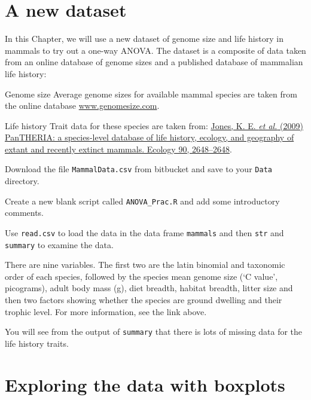 \section{A new dataset}

In this Chapter, we will use a new dataset of genome size and life 
history in mammals to try out a one-way ANOVA. The dataset is a 
composite of data taken from an online database of genome sizes and a 
published database of mammalian life history:

\begin{compactdesc}
	\item[Genome size] Average genome sizes for available mammal species 
	are taken from the online database  
	\href{www.genomesize.com}{www.genomesize.com}.
	\item[Life history] Trait data for these species are taken from: 
	\href{http://esapubs.org/archive/ecol/e090/184/metadata.htm}{
	Jones, K. E. {\it et al.} (2009) PanTHERIA: a species-level database 
	of life history, ecology, and geography of extant and recently 
	extinct mammals. Ecology 90, 2648--2648}.
\end{compactdesc}

\begin{compactitem}[$\quad\star$]
	\item Download the file {\tt MammalData.csv} from bitbucket and save 
	to your {\tt Data} directory.
	\item Create a new blank script called {\tt ANOVA\_Prac.R} and add 
	some introductory comments.
	\item Use {\tt read.csv} to load the data in the data frame 
	{\tt mammals} and then {\tt str} and {\tt summary} to examine 
	the data.
\end{compactitem}

There are nine variables. The first two are the latin binomial and 
taxonomic order of each species, followed by the species mean genome 
size (`C value', picograms), adult body mass (g), diet breadth, habitat 
breadth, litter size and then two factors showing whether the species 
are ground dwelling and their trophic level. For more information, see 
the link above.

You will see from the output of {\tt summary} that there is lots of 
missing data for the life history traits.

\section{Exploring the data with boxplots}

